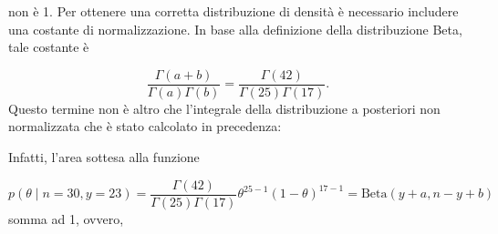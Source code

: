 \documentclass[
]{memoir}
\newenvironment{Shaded}{\begin{snugshade}}{\end{snugshade}}
\newcommand{\AttributeTok}[1]{\textcolor[rgb]{0.77,0.63,0.00}{#1}}
\newcommand{\CommentTok}[1]{\textcolor[rgb]{0.56,0.35,0.01}{\textit{#1}}}
\newcommand{\ControlFlowTok}[1]{\textcolor[rgb]{0.13,0.29,0.53}{\textbf{#1}}}
\newcommand{\DecValTok}[1]{\textcolor[rgb]{0.00,0.00,0.81}{#1}}
\newcommand{\FunctionTok}[1]{\textcolor[rgb]{0.00,0.00,0.00}{#1}}
\newcommand{\NormalTok}[1]{#1}
\newcommand{\OtherTok}[1]{\textcolor[rgb]{0.56,0.35,0.01}{#1}}
\newcommand{\SpecialCharTok}[1]{\textcolor[rgb]{0.00,0.00,0.00}{#1}}
\theoremstyle{definition}
\theoremstyle{definition}
\theoremstyle{definition}
\theoremstyle{definition}
\theoremstyle{remark}
\begin{document}
\noindent
non è 1. Per ottenere una corretta distribuzione di densità è necessario includere una costante di normalizzazione. In base alla definizione della distribuzione Beta, tale costante è

\[
\frac{\Gamma(a+b)}{\Gamma(a)\Gamma(b)} = \frac{\Gamma(42)}{\Gamma(25)\Gamma(17)}.
\]
Questo termine non è altro che l'integrale della distribuzione a posteriori non normalizzata che è stato calcolato in precedenza:

\begin{Shaded}
\end{Shaded}

\noindent
Infatti, l'area sottesa alla funzione

\[
p(\theta \mid n=30, y=23) =  \frac{\Gamma(42)}{\Gamma(25)\Gamma(17)}\theta^{25-1}(1-\theta)^{17-1} = \text{Beta}(y+a, n-y+b)
\]
\noindent
somma ad 1, ovvero,

\begin{Shaded}
\end{Shaded}
\end{document}
